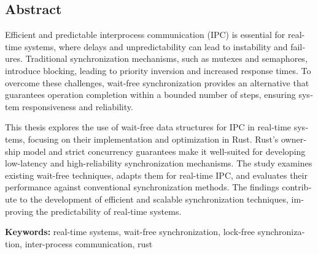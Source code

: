 \begin{otherlanguage}{english}
\chapter*{Abstract}


Efficient and predictable interprocess communication (IPC) is essential for real-time systems, where delays and unpredictability can lead to instability and failures. Traditional synchronization mechanisms, such as mutexes and semaphores, introduce blocking, leading to priority inversion and increased response times. To overcome these challenges, wait-free synchronization provides an alternative that guarantees operation completion within a bounded number of steps, ensuring system responsiveness and reliability.

This thesis explores the use of wait-free data structures for IPC in real-time systems, focusing on their implementation and optimization in Rust. Rust’s ownership model and strict concurrency guarantees make it well-suited for developing low-latency and high-reliability synchronization mechanisms. The study examines existing wait-free techniques, adapts them for real-time IPC, and evaluates their performance against conventional synchronization methods. The findings contribute to the development of efficient and scalable synchronization techniques, improving the predictability of real-time systems.

\vfill
\noindent\textbf{Keywords:} real-time systems, wait-free synchronization, lock-free synchronization, inter-process communication, rust
\vfill
\end{otherlanguage}

